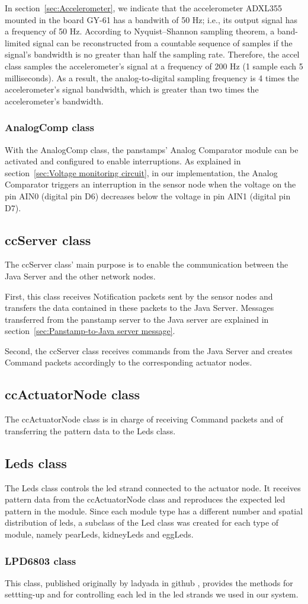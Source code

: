 In section~\ref{sec:Accelerometer}, we indicate that the accelerometer ADXL355 mounted in the board GY-61 has a bandwith of 50 Hz; i.e., its output signal has a frequency of 50 Hz. According to Nyquist–Shannon sampling theorem, a band-limited signal can be reconstructed from a countable sequence of samples if the signal's bandwidth is no greater than half the sampling rate. Therefore, the accel class samples the accelerometer's signal at a frequency of 200 Hz (1 sample each 5 milliseconds). As a result, the analog-to-digital sampling frequency is 4 times the accelerometer's signal bandwidth, which is greater than two times the accelerometer's bandwidth. 

\subsubsection{AnalogComp class}
With the AnalogComp class, the panstamps' Analog Comparator module can be activated and configured to enable interruptions. As explained in section~\ref{sec:Voltage monitoring circuit}, in our implementation, the Analog Comparator triggers an interruption in the sensor node when the voltage on the pin AIN0 (digital pin D6) decreases below the voltage in pin AIN1 (digital pin D7). 

\subsection{ccServer class}
The ccServer class' main purpose is to enable the communication between the Java Server and the other network nodes. 

First, this class receives Notification packets sent by the sensor nodes and transfers the data contained in these packets to the Java Server. Messages transferred from the panstamp server to the Java server are explained in section~\ref{sec:Panstamp-to-Java server message}. 

Second, the ccServer class receives commands from the Java Server and creates Command packets accordingly to the corresponding actuator nodes. 

\subsection{ccActuatorNode class}	
The ccActuatorNode class is in charge of receiving Command packets and of transferring the pattern data to the Leds class.  			
\newline 

\subsection{Leds class}	
The Leds class controls the led strand connected to the actuator node. It receives pattern data from the ccActuatorNode class and reproduces the expected led pattern in the module. Since each module type has a different number and spatial distribution of leds, a subclass of the Led class was created for each type of module, namely pearLeds, kidneyLeds and eggLeds. 

\subsubsection{LPD6803 class}	
This class, published originally by ladyada in github \cite{lady_ada_LPD6803}, provides the methods for settting-up and for controlling each led in the led strands we used in our system. 





